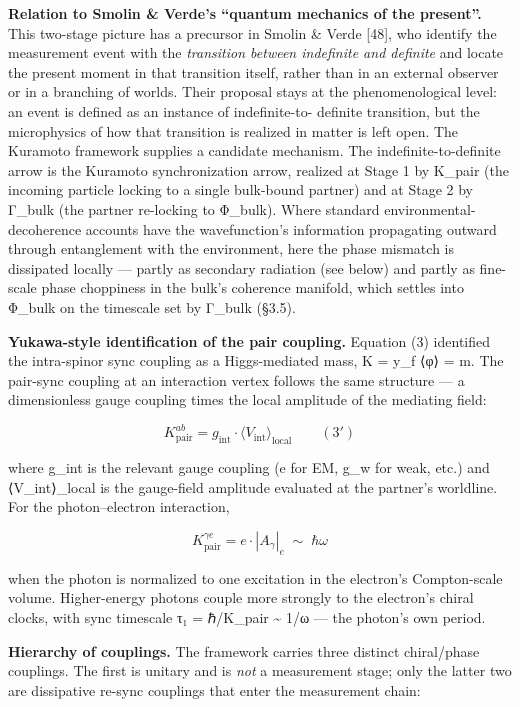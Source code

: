 \documentclass[
]{article}
\begin{document}
\textbf{Relation to Smolin \& Verde's ``quantum mechanics of the
present''.} This two-stage picture has a precursor in Smolin \& Verde
{[}48{]}, who identify the measurement event with the \emph{transition
between indefinite and definite} and locate the present moment in that
transition itself, rather than in an external observer or in a branching
of worlds. Their proposal stays at the phenomenological level: an event
is defined as an instance of indefinite-to- definite transition, but the
microphysics of how that transition is realized in matter is left open.
The Kuramoto framework supplies a candidate mechanism. The
indefinite-to-definite arrow is the Kuramoto synchronization arrow,
realized at Stage 1 by K\_pair (the incoming particle locking to a
single bulk-bound partner) and at Stage 2 by Γ\_bulk (the partner
re-locking to Φ\_bulk). Where standard environmental-decoherence
accounts have the wavefunction's information propagating outward through
entanglement with the environment, here the phase mismatch is dissipated
locally --- partly as secondary radiation (see below) and partly as
fine-scale phase choppiness in the bulk's coherence manifold, which
settles into Φ\_bulk on the timescale set by Γ\_bulk (§3.5).

\textbf{Yukawa-style identification of the pair coupling.} Equation (3)
identified the intra-spinor sync coupling as a Higgs-mediated mass, K =
y\_f ⟨φ⟩ = m. The pair-sync coupling at an interaction vertex follows
the same structure --- a dimensionless gauge coupling times the local
amplitude of the mediating field:

\[\boxed{K_{\text{pair}}^{ab} = g_{\text{int}} \cdot \langle V_{\text{int}} \rangle_{\text{local}}} \qquad (3')\]

where g\_int is the relevant gauge coupling (e for EM, g\_w for weak,
etc.) and ⟨V\_int⟩\_local is the gauge-field amplitude evaluated at the
partner's worldline. For the photon--electron interaction,

\[K_{\text{pair}}^{\gamma e} = e \cdot |A_\gamma|_{e} \;\sim\; \hbar\omega\]

when the photon is normalized to one excitation in the electron's
Compton-scale volume. Higher-energy photons couple more strongly to the
electron's chiral clocks, with sync timescale τ₁ = ℏ/K\_pair
\textasciitilde{} 1/ω --- the photon's own period.

\textbf{Hierarchy of couplings.} The framework carries three distinct
chiral/phase couplings. The first is unitary and is \emph{not} a
measurement stage; only the latter two are dissipative re-sync couplings
that enter the measurement chain:
\end{document}

